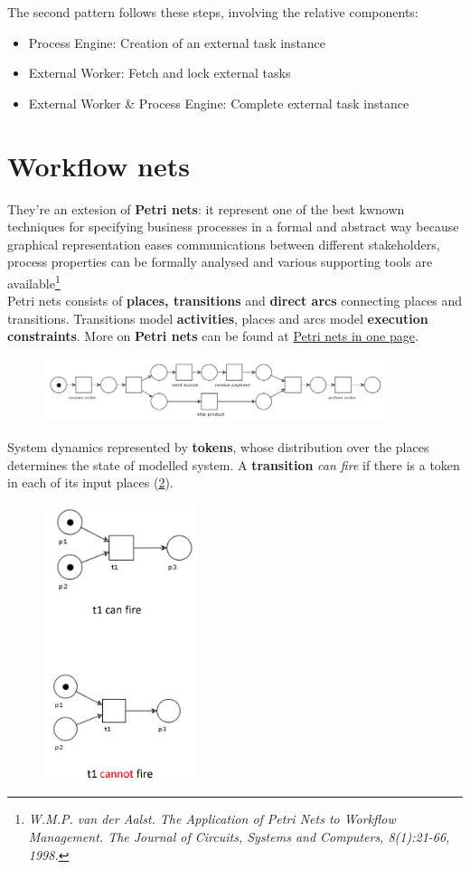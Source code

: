 \documentclass[10pt,a4paper]{report}
\begin{document}
The second pattern follows these steps, involving the relative components:
\begin{itemize}
	\item Process Engine: Creation of an external task instance
	\item External Worker: Fetch and lock external tasks
	\item External Worker \& Process Engine: Complete external task
	instance
\end{itemize}
\section{Workflow nets}
They're an extesion of \textbf{Petri nets}: it represent one of the best kwnown techniques  for specifying business processes in a formal and abstract way because graphical representation eases communications between different stakeholders, process properties can be formally analysed and various supporting tools are available\footnote{\textit{W.M.P. van der Aalst. The Application of Petri Nets to Workflow Management. The Journal of Circuits, Systems and Computers, 8(1):21-66, 1998.}}\\
Petri nets consists of \textbf{places, transitions} and \textbf{direct arcs} connecting places and transitions. Transitions model \textbf{activities}, places and arcs model \textbf{execution constraints}. More on \textbf{Petri nets} can be found at \href{http://pages.di.unipi.it/brogi/note.pdf}{Petri nets in one page}.
\begin{figure}[h]
	\centering
	\includegraphics[width=0.9\textwidth]{image78}
	\caption{}
	\label{image78}
\end{figure}
System dynamics represented by \textbf{tokens}, whose distribution over the places determines the state of modelled system. A \textbf{transition} \textit{can fire} if there is a token in each of its input places (\ref{image79}). 
\begin{figure}[h]
	\centering
	\includegraphics[width=0.4\textwidth]{image79}
	\caption{}
	\label{image79}
\end{figure}
\end{document}
